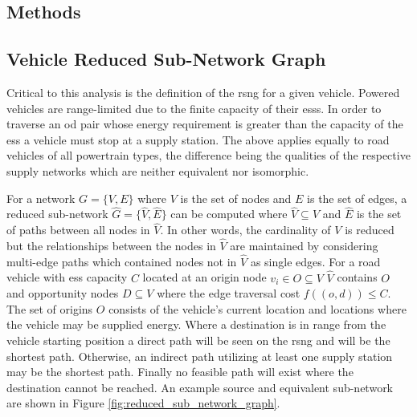 \documentclass[11pt]{article}
\begin{document}
\begin{multicols}{2}
\section*{Methods}

\subsection*{Vehicle Reduced Sub-Network Graph}

Critical to this analysis is the definition of the \gls{rsng} for a given vehicle. Powered vehicles are range-limited due to the finite capacity of their \glspl{ess}. In order to traverse an \gls{od} pair whose energy requirement is greater than the capacity of the \gls{ess} a vehicle must stop at a supply station. The above applies equally to road vehicles of all powertrain types, the difference being the qualities of the respective supply networks which are neither equivalent nor isomorphic.

For a network $G = \{V, E\}$ where $V$ is the set of nodes and $E$ is the set of edges, a reduced sub-network $\hat{G} = \{\hat{V}, \hat{E}\}$ can be computed where $\hat{V} \subseteq V$ and $\hat{E}$ is the set of paths between all nodes in $\hat{V}$. In other words, the cardinality of $V$ is reduced but the relationships between the nodes in $\hat{V}$ are maintained by considering multi-edge paths which contained nodes not in $\hat{V}$ as single edges. For a road vehicle with \gls{ess} capacity $C$ located at an origin node $v_i \in O \subseteq V$ $\hat{V}$ contains $O$ and opportunity nodes $D \subseteq V$ where the edge traversal cost $f((o, d)) \leq C$. The set of origins $O$ consists of the vehicle's current location and locations where the vehicle may be supplied energy. Where a destination is in range from the vehicle starting position a direct path will be seen on the \gls{rsng} and will be the shortest path. Otherwise, an indirect path utilizing at least one supply station may be the shortest path. Finally no feasible path will exist where the destination cannot be reached. An example source and equivalent sub-network are shown in Figure \ref{fig:reduced_sub_network_graph}.


\end{multicols}
\end{document}
